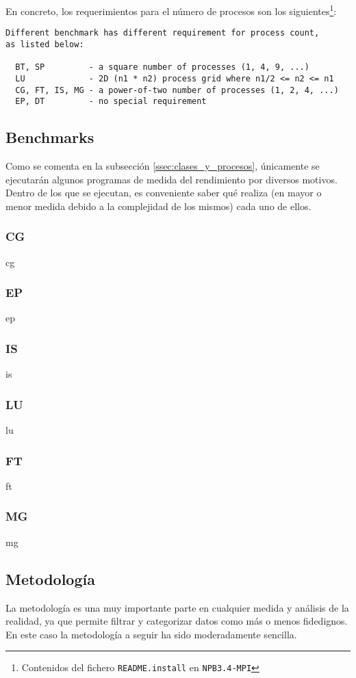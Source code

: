 En concreto, los requerimientos para el número de procesos son los siguientes\footnote{Contenidos del fichero \texttt{README.install} en \texttt{NPB3.4-MPI}}:

\begin{lstlisting}
Different benchmark has different requirement for process count,
as listed below:

  BT, SP         - a square number of processes (1, 4, 9, ...)
  LU             - 2D (n1 * n2) process grid where n1/2 <= n2 <= n1
  CG, FT, IS, MG - a power-of-two number of processes (1, 2, 4, ...)
  EP, DT         - no special requirement
\end{lstlisting}

\subsection{Benchmarks}
Como se comenta en la subsección \ref{ssec:clases_y_procesos}, únicamente se ejecutarán algunos programas de medida del rendimiento por diversos motivos. Dentro de los que se ejecutan, es conveniente saber qué realiza (en mayor o menor medida debido a la complejidad de los mismos) cada uno de ellos.

\subsubsection{CG}
cg

\subsubsection{EP}
ep

\subsubsection{IS}
is

\subsubsection{LU}
lu

\subsubsection{FT}
ft

\subsubsection{MG}
mg


\subsection{Metodología}
La metodología es una muy importante parte en cualquier medida y análisis de la realidad, ya que permite filtrar y categorizar datos como más o menos fidedignos. En este caso la metodología a seguir ha sido moderadamente sencilla.

